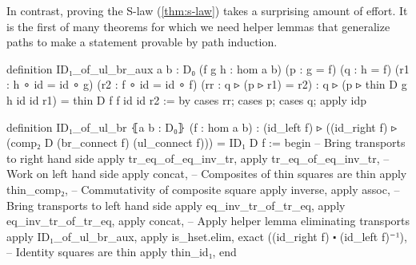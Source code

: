 In contrast, proving the S-law (\ref{thm:s-law}) takes a surprising amount of effort.
It is the first of many theorems for which we need helper lemmas that
generalize paths to make a statement provable by path induction.
\begin{leancodebr}
definition ID₁_of_ul_br_aux {a b : D₀} (f g h : hom a b)
  (p : g = f) (q : h = f)
  (r1 : h ∘ id = id ∘ g) (r2 : f ∘ id = id ∘ f)
  (rr : q ▹ (p ▹ r1) = r2) :
  q ▹ (p ▹ thin D g h id id r1) = thin D f f id id r2 :=
by cases rr; cases p; cases q; apply idp

definition ID₁_of_ul_br ⦃a b : D₀⦄ (f : hom a b) :
  (id_left f) ▹ ((id_right f) ▹
  (comp₂ D (br_connect f) (ul_connect f))) = ID₁ D f :=
begin
  -- Bring transports to right hand side
  apply tr_eq_of_eq_inv_tr, apply tr_eq_of_eq_inv_tr,
  -- Work on left hand side
  apply concat,
    -- Composites of thin squares are thin
    apply thin_comp₂,
    -- Commutativity of composite square
    apply inverse, apply assoc,
  -- Bring transports to left hand side
  apply eq_inv_tr_of_tr_eq, apply eq_inv_tr_of_tr_eq,
  apply concat,
    -- Apply helper lemma eliminating transports
    apply ID₁_of_ul_br_aux, apply is_hset.elim,
    exact ((id_right f) ⬝ (id_left f)⁻¹),
  -- Identity squares are thin
  apply thin_id₁,
end
\end{leancodebr}

